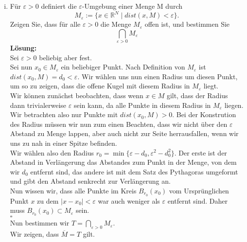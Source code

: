 \documentclass[11pt,a4paper,ngerman]{article}
\begin{document}
\begin{enumerate}[(i)]
		\item Für $\varepsilon > 0$ definiert die $\varepsilon$-Umgebung einer Menge M durch
			$$
				M_\varepsilon := \{ x \in \mathbb{R}^N \; | \; dist(x,M) < \varepsilon \}.
			$$
			Zeigen Sie, dass für alle $\varepsilon > 0$ die Menge $M_\varepsilon$ offen ist, und bestimmen Sie
			$$
				\underset{\varepsilon > 0}{\bigcap} M_\varepsilon
			$$
			\textbf{Lösung:}\\
			    Sei $\varepsilon > 0$ beliebig aber fest.\\
                Sei nun $x_0 \in M_\varepsilon$ ein beliebiger Punkt. Nach Definition
                von $M_\varepsilon$ ist $dist(x_0,M) = d_0 < \varepsilon$.
                Wir wählen uns nun einen Radius um diesen Punkt, um so zu zeigen, dass
                die offene Kugel mit diesem Radius in $M_\varepsilon$ liegt.\\
                Wir können zunächst beobachten, dass wenn $x \in M$ gilt, dass der
                Radius dann trivialerweise $\varepsilon$ sein kann, da alle Punkte
                in diesem Radius in $M_\varepsilon$ liegen. Wir betrachten also nur
                Punkte mit $dist(x_0,M) > 0$. Bei der Konstrution des Radius müssen wir nun
                zum einen Beachten, dass wir nicht über den $\varepsilon$ Abstand zu Menge lappen,
                aber auch nicht zur Seite herrausfallen, wenn wir uns zu nah in einer Spitze befinden.\\
                
                Wir wählen also den Radius $r_0 = \min \{\varepsilon - d_0, \varepsilon^2-d_0^2 \}$.
                Der erste ist der Abstand in Verlängerung das Abstandes zum Punkt in der Menge,
                von dem wir $d_0$ entfernt sind, das andere ist mit dem Satz des Pythagoras umgeformt
                und gibt den Abstand senkrecht zur Verlängerung an.\\
                Nun wissen wir, dass alle Punkte im Kreis $B_{r_0}(x_0)$ vom Ursprünglichen Punkt
                $x$ zu dem $|x - x_0 | < \varepsilon$ war auch weniger als $\varepsilon$ entfernt sind.
                Daher muss $B_{r_0}(x_0) \subset M_\varepsilon$ sein.\\
                \mbox{} \hfill $\square$\\
            
                Nun bestimmen wir $T = \underset{\varepsilon > 0}{\bigcap} M_\varepsilon$.\\
                Wir zeigen, dass $\overline{M} = T$ gilt.\\
                

\end{enumerate}
\end{document}
